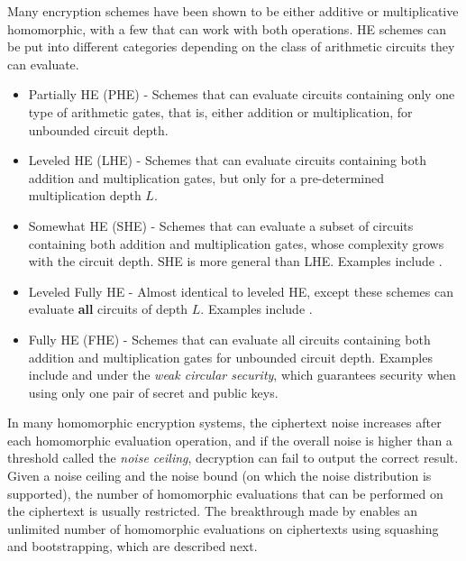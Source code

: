 \documentclass[../main.tex]{subfiles}
\begin{document}
Many encryption schemes have been shown to be either additive or multiplicative homomorphic, with a few that can work with both operations. HE schemes can be put into different categories depending on the class of arithmetic circuits they can evaluate.
\begin{itemize}
    \item Partially HE (PHE) - Schemes that can evaluate circuits containing only one type of arithmetic gates, that is, either addition or multiplication, for unbounded circuit depth. 
    
    \item Leveled HE (LHE) - Schemes that can evaluate circuits containing both addition and multiplication gates, but only for a pre-determined multiplication depth $L$. %
    
    \item Somewhat HE (SHE) - Schemes that can evaluate a subset of circuits containing both addition and multiplication gates, whose complexity grows with the circuit depth. SHE is more general than LHE. Examples include \cite{gentry2009fully,gentry2010computing}.        
    
    \item Leveled Fully HE - Almost identical to leveled HE, except these schemes can evaluate \textbf{all} circuits of depth $L$. Examples include \cite{brakerski2014efficient,brakerski2014leveled,brakerski2012fully}.
    
    \item Fully HE (FHE) - Schemes that can evaluate all circuits containing both addition and multiplication gates for unbounded circuit depth. Examples include \cite{gentry2009fully} and \cite{brakerski2014efficient,brakerski2014leveled,brakerski2012fully} under the \textit{weak circular security}, which guarantees security when using only one pair of secret and public keys.
    
\end{itemize}


In many homomorphic encryption systems, the ciphertext noise increases after each homomorphic evaluation operation, and if the overall noise is higher than a threshold called the \textit{noise ceiling}, decryption can fail to output the correct result. Given a noise ceiling %
and the noise bound (on which the noise distribution is supported), the number of homomorphic evaluations that can be performed on the ciphertext is usually restricted. The breakthrough made by \cite{gentry2009fully} enables an unlimited number of homomorphic evaluations on ciphertexts using squashing and bootstrapping, which are described next. 
\end{document}
